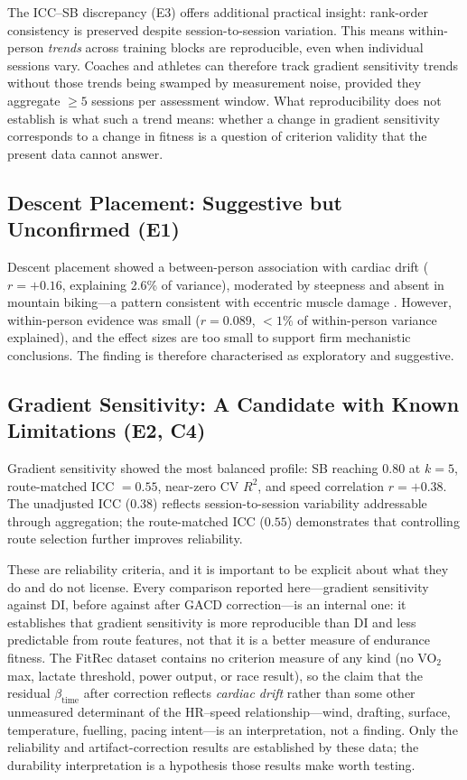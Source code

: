 \documentclass[times, twoside]{zHenriquesLab-StyleBioRxiv}
\begin{document}
The ICC--SB discrepancy (E3) offers additional practical insight: rank-order consistency is preserved despite session-to-session variation. This means within-person \textit{trends} across training blocks are reproducible, even when individual sessions vary. Coaches and athletes can therefore track gradient sensitivity trends without those trends being swamped by measurement noise, provided they aggregate $\geq 5$ sessions per assessment window. What reproducibility does not establish is what such a trend means: whether a change in gradient sensitivity corresponds to a change in fitness is a question of criterion validity that the present data cannot answer.

\subsection*{Descent Placement: Suggestive but Unconfirmed (E1)}

Descent placement showed a between-person association with cardiac drift ($r = +0.16$, explaining 2.6\% of variance), moderated by steepness and absent in mountain biking---a pattern consistent with eccentric muscle damage \cite{peake2017}. However, within-person evidence was small ($r = 0.089$, $< 1\%$ of within-person variance explained), and the effect sizes are too small to support firm mechanistic conclusions. The finding is therefore characterised as exploratory and suggestive.

\subsection*{Gradient Sensitivity: A Candidate with Known Limitations (E2, C4)}

Gradient sensitivity showed the most balanced profile: SB reaching $0.80$ at $k = 5$, route-matched ICC $= 0.55$, near-zero CV $R^2$, and speed correlation $r = +0.38$. The unadjusted ICC ($0.38$) reflects session-to-session variability addressable through aggregation; the route-matched ICC ($0.55$) demonstrates that controlling route selection further improves reliability.

These are reliability criteria, and it is important to be explicit about what they do and do not license. Every comparison reported here---gradient sensitivity against DI, before against after GACD correction---is an internal one: it establishes that gradient sensitivity is more reproducible than DI and less predictable from route features, not that it is a better measure of endurance fitness. The FitRec dataset contains no criterion measure of any kind (no VO$_2$max, lactate threshold, power output, or race result), so the claim that the residual $\beta_{\text{time}}$ after correction reflects \textit{cardiac drift} rather than some other unmeasured determinant of the HR--speed relationship---wind, drafting, surface, temperature, fuelling, pacing intent---is an interpretation, not a finding. Only the reliability and artifact-correction results are established by these data; the durability interpretation is a hypothesis those results make worth testing.
\end{document}
